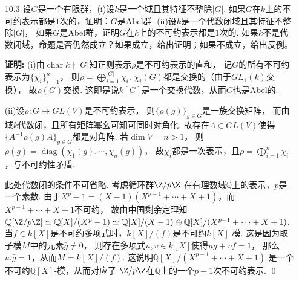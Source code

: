 \begin{enumerate}
        同理可以算出:$\displaystyle g.(e_{i} \otimes e_{j} - e_{j} \otimes e_{i}) = \sum_{k,l=1}^{n}(a_{ik}a_{jl}+a_{il}a_{jk})(e_{k} \otimes e_{l} - e_{k} \otimes e_{l}) \in S^{2}(V). $
        且注意到
        $g.(e_{i} \otimes e_{j} + e_{j} \otimes e_{i}) $中
        $e_{i} \otimes e_{j} + e_{j} \otimes e_{i}$
        处的分量为$a_{ii}a_{jj}+a_{ij}a_{ji}$，
        故
        \begin{equation*}\begin{aligned}
            2\operatorname{tr}(\rho_{S^{2}(V)}(g))
            &= 2\sum_{i \leq j}a_{ii}a_{jj} + 2\sum_{i \leq j}a_{ij}a_{ji}
            =\sum_{i,j=1}^{n}a_{ij}a_{ji} + \sum_{i=1}^{n}a_{ii}^{2} 
            + \sum_{i,j=1}^{n}a_{ii}a_{jj} + \sum_{i=1}^{n}a_{ii}^{2} \\
            &= \sum_{i,j=1}^{n}a_{ij}a_{ji} + \bigg(\sum_{i=1}^{n}a_{ii}\bigg)^{2}
            = \operatorname{tr}(\rho(g^{2})) + \operatorname{tr}(\rho(g))^{2}.
        \end{aligned}\end{equation*}
        这即$2\chi_{S}(g) = \chi(g^{2}) + \chi(g)^{2}$.
        类似可证$2\chi_{A}(g) = -\chi(g^{2}) + \chi(g)^{2}$. \qed

\item[10.3] 设$G$是一个有限群，(i)设$k$是一个域且其特征不整除$|G|$.
    如果$G$在$k$上的不可约表示都是$1$次的，证明：$G$是Abel群.
    (ii)设$k$是一个代数闭域且其特征不整除$|G|$，
    如果$G$是Abel群，证明$G$在$k$上的不可约表示都是$1$次的.
    如果$k$不是代数闭域，命题是否仍然成立？如果成立，给出证明；如果不成立，给出反例。
\item[\textbf{证明:}]
    (i)由$\operatorname{char} k \nmid |G|$知正则表示$\rho$是不可约表示的直和，
    记$G$的所有不可约表示为$\{\chi_{i}\}_{i=1}^{n}$，
    则$\rho = \bigoplus\limits_{i=1}^{|G|}\chi_{i}$. 
    $\chi_{i}(G)$都是交换的（由于$GL_{1}(k)$交换），
    故$\rho(G)$交换. 这即是说$k[G]$是一个交换代数，从而$G$也是Abel的.

    (ii)设$\rho:G \mapsto GL(V)$是不可约表示，
    则$\{\rho(g)\}_{g \in G}$是一族交换矩阵，
    而由域$k$代数闭，且所有矩阵幂幺可知可同时对角化. 故存在$A \in GL(V)$使得
    $\{A^{-1}\rho(g)A\}_{g \in G}$都是对角阵. 若$\dim V = n > 1$，
    则$\rho(g) = \operatorname{diag}(\chi_{1}(g),\cdots,\chi_{n}(g))$，
    故$\chi_{i}$都是一次表示，且$\rho = \bigoplus\limits_{i=1}^{n} \chi_{i}$，与不可约性矛盾.

    此处代数闭的条件不可省略. 考虑循环群$\Z / p \Z$
    在有理数域$\mathbb{Q}$上的表示，$p$是一个素数. 
    由于$X^{p}-1 = (X-1)(X^{p-1}+\cdots+X+1)$，而$X^{p-1}+\cdots+X+1$不可约，
    故由中国剩余定理知$\mathbb{Q}[\Z / p \Z] \simeq \mathbb{Q}[X]/(X^{p}-1) 
    \simeq \mathbb{Q}[X]/(X-1) \oplus \mathbb{Q}[X]/(X^{p-1}+\cdots+X+1)$.
    当$f \in k[X]$是不可约多项式时，$k[X]/(f)$是不可约$k[X]$-模. 
    这是因为取子模$M$中的元素$\bar{g} \neq \bar{0}$，
    则存在多项式$u,v \in k[X]$使得$ug+vf=1$，
    那么$u.\bar{g}=\bar{1}$，从而$M=k[X]/(f)$.
    这说明$\mathbb{Q}[X]/(X^{p-1}+\cdots+X+1)$
    是一个不可约$\mathbb{Q}[X]$-模，从而对应了
    $\Z / p \Z$在$\mathbb{Q}$上的一个$p-1$次不可约表示. \qed


\end{enumerate}

